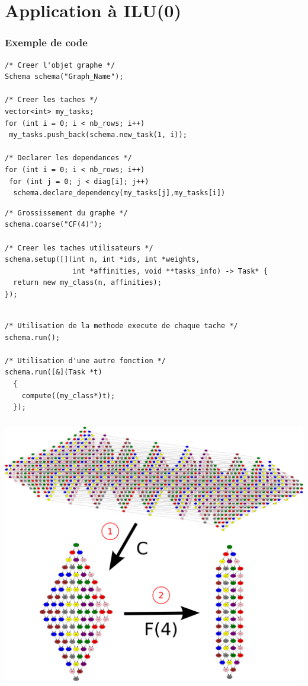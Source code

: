 \documentclass{beamer}
\begin{document}
\section{Application à ILU(0)}
\begin{frame}
  \frametitle{Exemple de code}

 \begin{lstlisting}
/* Creer l'objet graphe */
Schema schema("Graph_Name");

/* Creer les taches */
vector<int> my_tasks;
for (int i = 0; i < nb_rows; i++)
 my_tasks.push_back(schema.new_task(1, i));

/* Declarer les dependances */
for (int i = 0; i < nb_rows; i++)
 for (int j = 0; j < diag[i]; j++)
  schema.declare_dependency(my_tasks[j],my_tasks[i])
 \end{lstlisting}


\framebreak

 \begin{lstlisting}
/* Grossissement du graphe */
schema.coarse("CF(4)");

/* Creer les taches utilisateurs */
schema.setup([](int n, int *ids, int *weights,
                int *affinities, void **tasks_info) -> Task* {
  return new my_class(n, affinities);
});
 \end{lstlisting}
\framebreak

 \begin{lstlisting}

/* Utilisation de la methode execute de chaque tache */
schema.run();

/* Utilisation d'une autre fonction */
schema.run([&](Task *t)
  {
    compute((my_class*)t);
  });
 \end{lstlisting}

\end{frame}

\begin{frame}
  \frametitle{}
  \centerline{\includegraphics[width=0.9\linewidth]{G_agg}}
\end{frame}
\end{document}
